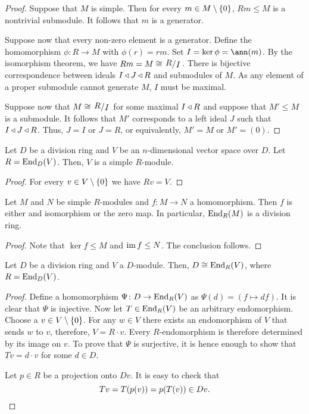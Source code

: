 \begin{proof}
Suppose that $M$ is simple. Then for every
$m \in M \setminus \left\{0\right\}$, $Rm \leq M$ is a nontrivial submodule.
It follows that $m$ is a generator.

Suppose now that every non-zero element is a generator. Define the
homomorphism $\phi \colon R \to M$ with $\phi(r) = rm$. Set
$I = \ker \phi = \ann(m)$. By the isomorphism theorem, we have
$Rm = M \cong \kvoc{R}{I}$. There is bijective correspondence
between ideals $I \triangleleft J \triangleleft R$ and submodules of $M$. As any
element of a proper submodule cannot generate $M$, $I$ must be
maximal.

Suppose now that $M \cong \kvoc{R}{I}$ for some maximal $I \triangleleft R$
and suppose that $M' \leq M$ is a submodule. It follows that $M'$
corresponds to a left ideal $J$ such that $I \triangleleft J \triangleleft R$. Thus,
$J = I$ or $J = R$, or equivalently, $M' = M$ or $M' = (0)$.
\end{proof}

\begin{posledica}
\label{fin_dim_alg:psl:vec_simp}
Let $D$ be a division ring and $V$ be an $n$-dimensional vector
space over $D$. Let $R = \operatorname{End}_D(V)$. Then, $V$ is a simple
$R$-module.
\end{posledica}

\begin{proof}
For every $v \in V \setminus \left\{0\right\}$ we have $Rv = V$.
\end{proof}

\begin{izrek}
Let $M$ and $N$ be simple $R$-modules and $f \colon M \to N$ a
homomorphism. Then $f$ is either and isomorphism or the zero map.
In particular, $\operatorname{End}_R(M)$ is a division ring.
\end{izrek}

\begin{proof}
Note that $\ker f \leq M$ and $\operatorname{im} f \leq N$. The conclusion
follows.
\end{proof}

\begin{trditev}
Let $D$ be a division ring and $V$ a $D$-module. Then,
$D \cong \operatorname{End}_R(V)$, where $R = \operatorname{End}_D(V)$.
\end{trditev}

\begin{proof}
Define a homomorphism $\Psi \colon D \to \operatorname{End}_R(V)$ as
$\Psi(d) = (f \mapsto df)$. It is clear that $\Psi$ is injective.
Now let $T \in \operatorname{End}_R(V)$ be an arbitrary endomorphism. Choose a
$v \in V \setminus \left\{0\right\}$. For any $w \in V$ there exists an
endomorphism of $V$ that sends $w$ to $v$, therefore,
$V = R \cdot v$. Every $R$-endomorphism is therefore determined
by its image on $v$. To prove that $\Psi$ is surjective, it is
hence enough to show that $Tv = d \cdot v$ for some $d \in D$.

Let $p \in R$ be a projection onto $Dv$. It is easy to check that
\[
Tv = T(p(v)) = p(T(v)) \in Dv. \qedhere
\]
\end{proof}

